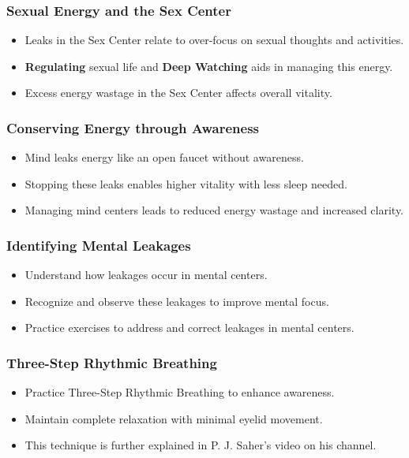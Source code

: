 \begin{frame}[fragile]\frametitle{Sexual Energy and the Sex Center}
    \begin{itemize}
        \item Leaks in the Sex Center relate to over-focus on sexual thoughts and activities.
        \item \textbf{Regulating} sexual life and \textbf{Deep Watching} aids in managing this energy.
        \item Excess energy wastage in the Sex Center affects overall vitality.
    \end{itemize}
\end{frame}

\begin{frame}[fragile]\frametitle{Conserving Energy through Awareness}
    \begin{itemize}
        \item Mind leaks energy like an open faucet without awareness.
        \item Stopping these leaks enables higher vitality with less sleep needed.
        \item Managing mind centers leads to reduced energy wastage and increased clarity.
    \end{itemize}
\end{frame}

\begin{frame}[fragile]\frametitle{Identifying Mental Leakages}
    \begin{itemize}
        \item Understand how leakages occur in mental centers.
        \item Recognize and observe these leakages to improve mental focus.
        \item Practice exercises to address and correct leakages in mental centers.
    \end{itemize}
\end{frame}

\begin{frame}[fragile]\frametitle{Three-Step Rhythmic Breathing}
    \begin{itemize}
        \item Practice Three-Step Rhythmic Breathing to enhance awareness.
        \item Maintain complete relaxation with minimal eyelid movement.
        \item This technique is further explained in P. J. Saher’s video on his channel.
    \end{itemize}
\end{frame}

